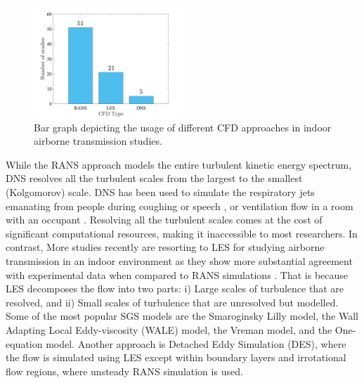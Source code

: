 \documentclass[a4paper,12pt]{elsarticle}
\begin{document}
\begin{figure}[ht]
\captionsetup{font=normalsize}
    \centering
    \includegraphics[width=0.5\textwidth]{figures/cfd.jpg}
    \caption{Bar graph depicting the usage of different CFD approaches in indoor airborne transmission studies.}
    \label{fig:cfd}
\end{figure}

While the RANS approach models the entire turbulent kinetic energy spectrum, DNS resolves all the turbulent scales from the largest to the smallest (Kolgomorov) \cite{kolmogorov1941local} scale. DNS has been used to simulate the respiratory jets emanating from people during coughing \cite{rosti2020fluid,diwan2020understanding, chong2021extended} or speech \cite{giri2022colliding, singhal2022virus}, or ventilation flow in a room with an occupant \cite{yerragolam2024effect}. Resolving all the turbulent scales comes at the cost of significant computational resources, making it inaccessible to most researchers. In contrast, More studies recently are resorting to LES for studying airborne transmission in an indoor environment \cite{vuorinen2020modelling,feng2020study,khosronejad2020fluid} as they show more substantial agreement with experimental data when compared to RANS simulations \cite{wu2023numerical}. That is because LES decomposes the flow into two parts: i) Large scales of turbulence that are resolved, and ii) Small scales of turbulence that are unresolved but modelled. Some of the most popular SGS models are the Smaroginsky Lilly model, the Wall Adapting Local Eddy-viscosity (WALE) model, the Vreman model, and the One-equation model. Another approach is Detached Eddy Simulation (DES), where the flow is simulated using LES except within boundary layers and irrotational flow regions, where unsteady RANS simulation is used.
\end{document}
